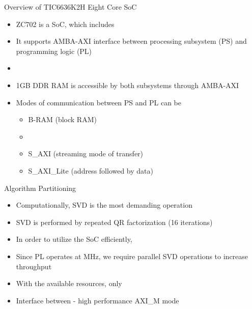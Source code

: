 \documentclass[11pt]{beamer}
\begin{document}
\begin{frame}{Overview of TIC6636K2H Eight Core SoC}
	\begin{itemize}
		\item ZC702 is a SoC, which includes 
		\item It supports AMBA-AXI interface between processing subsystem (PS) and programming logic (PL)
		\item {}
		\item 1GB DDR RAM is accessible by both subsystems through AMBA-AXI
		\item Modes of communication between PS and PL can be
		\begin{itemize}
			\item B-RAM (block RAM)
			\item {}
			\item S\_AXI (streaming mode of transfer)
			\item S\_AXI\_Lite (address followed by data)
		\end{itemize}
	\end{itemize}
\end{frame}

\begin{frame}{Algorithm Partitioning}
	\begin{itemize}
		\item Computationally, SVD is the most demanding operation
		\item SVD is performed by repeated QR factorization (16 iterations)
		\item In order to utilize the SoC efficiently, 
		\item Since PL operates at  MHz, we require parallel SVD operations to increase throughput
		\item With the available resources, only 
		\item Interface between  - high performance AXI\_M mode
	\end{itemize}
\end{frame}
\end{document}
